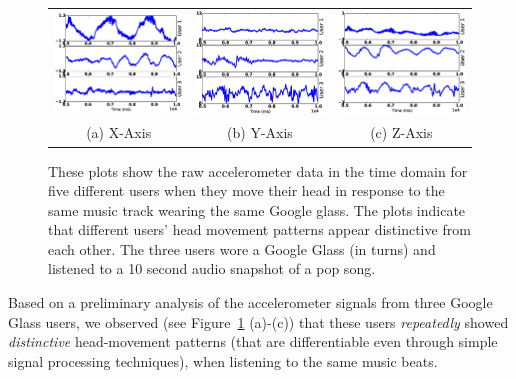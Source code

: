 \begin{figure}[t]
\begin{center}
\begin{tabular}{ccc}
\includegraphics [width=.33\linewidth]{figure/raw_x.eps}&
\includegraphics [width=.33\linewidth]{figure/raw_y.eps}&
\includegraphics [width=.33\linewidth]{figure/raw_z.eps}\\
(a) X-Axis & (b) Y-Axis & (c) Z-Axis \\
\end{tabular}
\end{center}
\caption{\label{fig:raw} These plots show the raw accelerometer data in the
time domain for five different users when they move their head in response to
the same music track wearing the same Google glass. The plots
indicate that different users' head movement patterns appear distinctive from
each other. The three users wore a Google Glass (in turns) and listened to a
10 second audio snapshot of a pop song.}
\vspace{-2pt}
\end{figure} 


Based on a preliminary analysis of the accelerometer signals from three Google Glass
users, we observed (see Figure~\ref{fig:raw} (a)-(c))
that these users {\em repeatedly} showed {\em distinctive} head-movement patterns
(that are differentiable even through simple signal processing techniques),
when listening to the same music beats.




